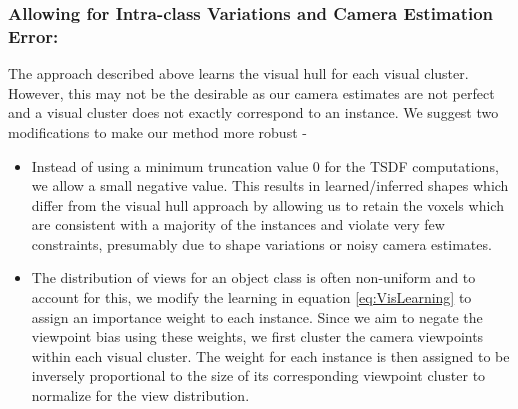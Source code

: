 \subsubsection{Allowing for Intra-class Variations and Camera Estimation Error:}
The approach described above learns the visual hull for each visual cluster. However, this may not be the desirable as our camera estimates are not perfect and a visual cluster does not exactly correspond to an instance. We suggest two modifications to make our method more robust -
\begin{itemize}
\item Instead of using a minimum truncation value 0 for the TSDF computations, we allow a small negative value. This results in learned/inferred shapes which differ from the visual hull approach by allowing us to retain the voxels which are consistent with a majority of the instances and violate very few constraints, presumably due to shape variations or noisy camera estimates.
\item The distribution of views for an object class is often non-uniform and to account for this, we modify the learning in equation \ref{eq:VisLearning} to assign an importance weight to each instance. Since we aim to negate the viewpoint bias using these weights, we first cluster the camera viewpoints within each visual cluster. The weight for each instance is then assigned to be inversely proportional to the size of its corresponding viewpoint cluster to normalize for the view distribution.
\end{itemize}

